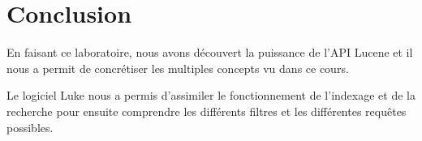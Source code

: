\chapter{Conclusion}

En faisant ce laboratoire, nous avons découvert la puissance de l'API Lucene et il nous a permit de concrétiser les multiples concepts vu dans ce cours.

Le logiciel Luke nous a permis d'assimiler le fonctionnement de l'indexage et de la recherche pour ensuite comprendre les différents filtres et les différentes requêtes possibles.
